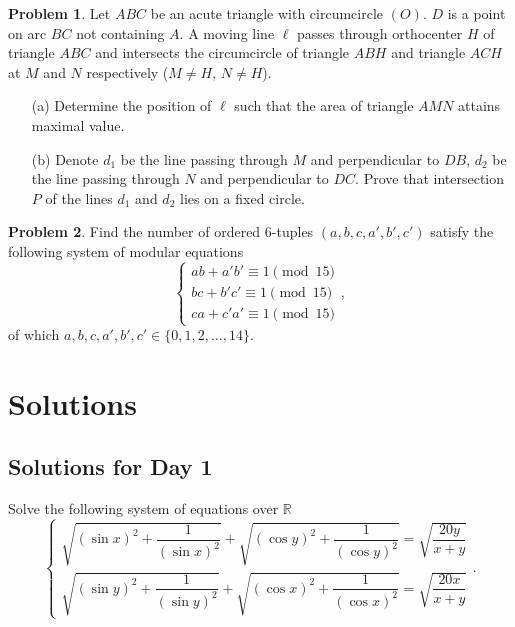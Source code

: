 \documentclass[11pt]{article}
\theoremstyle{definition}
\newtheorem{exercise}{Problem}
\newcommand{\boom}{\vspace{0.25cm}}
\begin{document}
        \boom
    
        \begin{exercise}
            Let \(ABC\) be an acute triangle with circumcircle \((O)\). \(D\) is a point on arc \(BC\) not containing \(A\). A moving line \(\ell\) passes through orthocenter \(H\) of triangle \(ABC\) and intersects the circumcircle of triangle \(ABH\) and triangle \(ACH\) at \(M\) and \(N\) respectively (\(M \neq H\), \(N \neq H\)).
            \begin{enumerate}
                \item[(a)] Determine the position of \(\ell\) such that the area of triangle \(AMN\) attains maximal value.
                \item[(b)] Denote \(d_1\) be the line passing through \(M\) and perpendicular to \(DB\), \(d_2\) be the line passing through \(N\) and perpendicular to \(DC\). Prove that intersection \(P\) of the lines \(d_1\) and \(d_2\) lies on a fixed circle.
            \end{enumerate}
        \end{exercise}
    
        \boom
    
        \begin{exercise}
            Find the number of ordered 6-tuples \((a,b,c,a',b',c')\) satisfy the following system of modular equations
            \[\begin{cases}
                ab + a'b' \equiv 1 \pmod{15} \\
                bc + b'c' \equiv 1 \pmod{15} \\
                ca + c'a' \equiv 1 \pmod{15} 
            \end{cases},\]
            of which \(a,b,c,a',b',c' \in \{0,1,2,\dots,14\}\).
        \end{exercise}

    \newpage

\section{Solutions}

    \subsection{Solutions for Day 1}

        \begin{problem}
            Solve the following system of equations over \(\mathbb{R}\)
            \[\begin{cases}
                \sqrt{\left(\sin x\right)^2 + \dfrac{1}{\left(\sin x\right)^2}} + \sqrt{\left(\cos y\right)^2 + \dfrac{1}{\left(\cos y\right)^2}} = \sqrt{\dfrac{20y}{x + y}} \\
                \sqrt{\left(\sin y\right)^2 + \dfrac{1}{\left(\sin y\right)^2}} + \sqrt{\left(\cos x\right)^2 + \dfrac{1}{\left(\cos x\right)^2}} = \sqrt{\dfrac{20x}{x + y}}
            \end{cases}.\]
        \end{problem}
\end{document}
